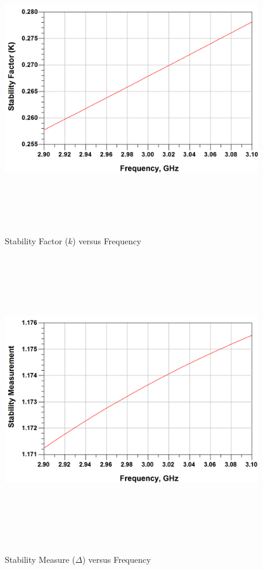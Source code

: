 \begin{figure}
  \centering
  \includegraphics[width=5in,height=5in,keepaspectratio]{figures/simulation/stab_fact}\\
  \caption{Stability Factor ($k$) versus Frequency}
  \label{fig:stab_fact}

  \vspace*{\floatsep}

  \centering
  \includegraphics[width=5in,height=5in,keepaspectratio]{figures/simulation/stab_meas}\\
  \caption{Stability Measure ($\Delta$) versus Frequency}
  \label{fig:stab_meas}
\end{figure}

